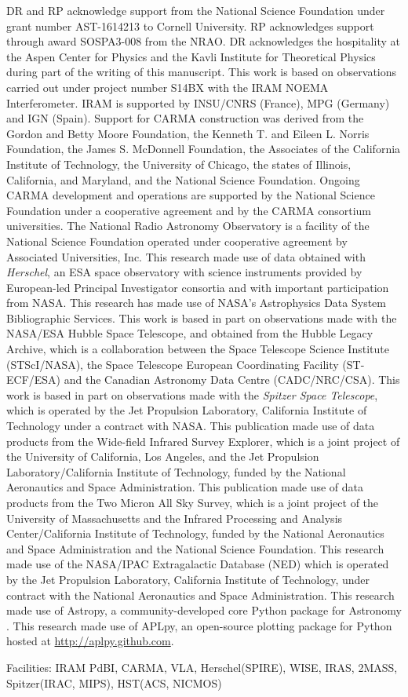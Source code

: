 \documentclass[]{emulateapj}
\def\spitzer {{\it Spitzer Space Telescope}\xspace}
\begin{document}
DR and RP acknowledge support from the National Science Foundation
under grant number AST-1614213 to Cornell University. RP acknowledges
support through award SOSPA3-008 from the NRAO. DR acknowledges the
hospitality at the Aspen Center for Physics and the Kavli Institute
for Theoretical Physics during part of the writing of this manuscript.
This work is based on observations carried out under project number S14BX
with the IRAM NOEMA Interferometer. IRAM is supported by INSU/CNRS (France), MPG (Germany) and IGN (Spain).
Support for CARMA construction was derived from the Gordon and Betty Moore
Foundation, the Kenneth T. and Eileen L. Norris Foundation, the James S.
McDonnell Foundation, the Associates of the California Institute of
Technology, the University of Chicago, the states of Illinois, California, and
Maryland, and the National Science Foundation. Ongoing CARMA development and
operations are supported by the National Science Foundation under a
cooperative agreement and by the CARMA consortium universities.
The National Radio Astronomy Observatory is a facility of the National Science
Foundation operated under cooperative agreement by Associated
Universities, Inc.
This research made use of data obtained with {\it Herschel}, an ESA space
observatory with science instruments provided by European-led Principal
Investigator consortia and with important participation from NASA.
This research has made use of NASA's Astrophysics Data System Bibliographic
Services.
This work is based in part on observations
made with the NASA/ESA Hubble Space Telescope, and obtained from the Hubble
Legacy Archive, which is a collaboration between the Space Telescope Science
Institute (STScI/NASA), the Space Telescope European Coordinating Facility
(ST-ECF/ESA) and the Canadian Astronomy Data Centre (CADC/NRC/CSA).
This work is based
in part on observations made with the \spitzer,
which is operated by the Jet Propulsion Laboratory, California Institute of
Technology under a contract with NASA.
This publication made use of data products from the Wide-field Infrared
Survey Explorer, which is a joint project of the University of California, Los
Angeles, and the Jet Propulsion Laboratory/California Institute of Technology,
funded by the National Aeronautics and Space Administration.
This publication made use of data products from the Two Micron All Sky
Survey, which is a joint project of the University of Massachusetts and the
Infrared Processing and Analysis Center/California Institute of Technology,
funded by the National Aeronautics and Space Administration and the National
Science Foundation.
This research made use of the NASA/IPAC Extragalactic Database (NED) which
is operated by the Jet Propulsion Laboratory, California Institute of
Technology, under contract with the National Aeronautics and Space
Administration.
This research made use of Astropy, a community-developed core Python package for Astronomy \citep{astropy}.
This research made use of APLpy, an open-source plotting package for Python hosted at \url{http://aplpy.github.com}.

Facilities: IRAM PdBI, CARMA, VLA, Herschel(SPIRE), WISE, IRAS, 2MASS, Spitzer(IRAC, MIPS), HST(ACS, NICMOS)






\end{document}
